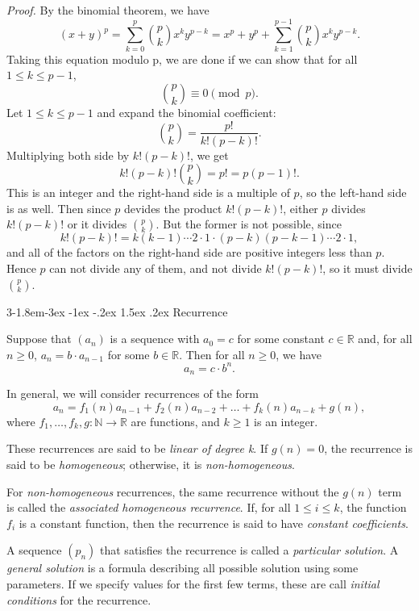 \documentclass{tufte-handout}
\makeatletter
\renewcommand{\subsection}{\@startsection{subsection}%
    {3}{-1.8em}{-3ex \@plus -1ex \@minus -.2ex}%
    {1.5ex \@plus .2ex}
    {\hspace*{-5.5em}\fcolorbox{ltblue}{ltblue}{\parbox[c][1.0ex][b]{4em}{\phantom{space}}}
    \normalfont\large\itshape\color{ltblue}}}
\makeatother
\begin{document}
\textit{Proof.} By the binomial theorem, we have
\[(x+y)^p = \sum_{k=0}^{p}\binom{p}{k}x^{k}y^{p-k} = x^{p} + y^p + \sum_{k=1}^{p-1}\binom{p}{k}x^{k}y^{p-k}.\]
Taking this equation modulo p, we are done if we can show that for all \( 1 \leq k \leq p-1 \),
\[\binom{p}{k} \equiv 0 \pmod{p}.\]
Let \( 1 \leq k \leq p-1 \) and expand the binomial coefficient:
\[\binom{p}{k} = \frac{p!}{k!(p-k)!}.\]
Multiplying both side by \( k!(p-k)!\), we get
\[k!(p-k)!\binom{p}{k} = p! = p(p-1)!.\]
This is an integer and the right-hand side is a multiple of \( p \), so the left-hand side is as well.
Then since \( p \) devides the product \( k!(p-k)! \), either \( p \) divides \( k!(p-k)!\) or it 
divides \( \binom{p}{k} \). But the former is not possible, since
\[k!(p-k)! = k(k-1)\cdots 2\cdot 1 \cdot (p-k)(p-k-1)\cdots 2\cdot 1,\]
and all of the factors on the right-hand side are positive integers less than \( p \).
Hence \( p \) can not divide any of them, and not divide \( k!(p-k)!\),
 so it must divide \( \binom{p}{k} \). \hfill \qedsymbol


\subsection{Recurrence}
\begin{Proposition}
    Suppose that \( (a_n)\) is a sequence with \( a_0=c \)
    for some constant \( c \in \mathbb{R} \) and, for all \( n \geq 0 \),
    \( a_n=b\cdot a_{n-1} \) for some \( b \in \mathbb{R} \). Then for all \( n \geq 0 \),
    we have
    \[ a_n = c\cdot b^n.\]
\end{Proposition}

In general, we will consider recurrences of the form
\[ a_n = f_1(n)a_{n-1} + f_2(n)a_{n-2} + \ldots + f_k(n)a_{n-k} + g(n),\]
where \( f_1, \ldots, f_k,g: \mathbb{N} \to \mathbb{R} \) are functions, and \( k\geq 1 \) is an integer.

These recurrences are said to be \textit{linear of degree k}. If \( g(n) = 0 \),
the recurrence is said to be \textit{homogeneous}; otherwise, it is \textit{non-homogeneous}.

For \textit{non-homogeneous} recurrences, the same recurrence without the \( g(n) \) term 
is called the \textit{associated homogeneous recurrence}. If, for all \( 1\leq i \leq k \), the
function \( f_i \) is a constant function, then the recurrence is said to have \textit{constant coefficients}.

A sequence \( (p_n) \) that satisfies the recurrence is called a \textit{particular solution}.
A \textit{general solution} is a formula describing all possible solution using some parameters.
If we specify values for the first few terms, these are call \textit{initial conditions} for the recurrence.
\end{document}
